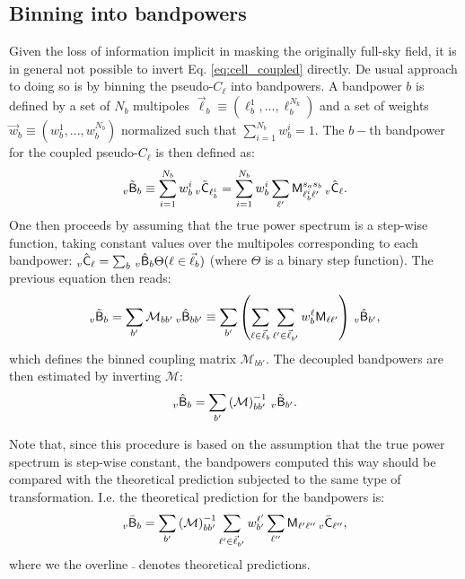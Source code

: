 \documentclass[a4paper,10pt]{article}
\begin{document}
\subsection{Binning into bandpowers}
  Given the loss of information implicit in masking the originally full-sky field, it is in general not possible to invert Eq. \ref{eq:cell_coupled} directly. De usual approach to doing so is by binning the pseudo-$C_\ell$ into bandpowers. A bandpower $b$ is defined by a set of $N_b$ multipoles $\vec{\ell}_b\equiv(\ell_b^1,...,\ell_b^{N_k})$ and a set of weights $\vec{w}_b\equiv(w_b^1,...,w_b^{N_b})$ normalized such that $\sum_{i=1}^{N_b}w_b^i=1$. The $b-$th bandpower for the coupled pseudo-$C_\ell$ is then defined as:
  \begin{equation}
    _v\tilde{\sf B}_b \equiv\sum_{i=1}^{N_b}w_b^i\,_v\tilde{\sf C}_{\ell_b^i}
    =\sum_{i=1}^{N_b}w_b^i\sum_{\ell'}{\sf M}^{s_as_b}_{\ell_b^i\ell'}\,_v\hat{\sf C}_\ell.
  \end{equation}
  One then proceeds by assuming that the true power spectrum is a step-wise function, taking constant values over the multipoles corresponding to each bandpower: $_v\hat{\sf C}_\ell=\sum_b\,_v\hat{\sf B}_b\Theta(\ell\in\vec{\ell}_b)$ (where $\Theta$ is a binary step function). The previous equation then reads:
  \begin{equation}
   _v\tilde{\sf B}_b=\sum_{b'}\mathcal{M}_{bb'}\,_v\hat{\sf B}_{bb'}\equiv\sum_{b'}\left(\sum_{\ell\in\vec{\ell}_b}\sum_{\ell'\in\vec{\ell}_{b'}}w_b^\ell{\sf M}_{\ell\ell'}\right)\,_v\hat{\sf B}_{b'},
  \end{equation}
  which defines the binned coupling matrix $\mathcal{M}_{bb'}$. The decoupled bandpowers are then estimated by inverting $\mathcal{M}$:
  \begin{equation}
    _v\hat{\sf B}_b=\sum_{b'}\left(\mathcal{M}\right)^{-1}_{bb'}\,_v\tilde{\sf B}_{b'}.
  \end{equation}

  Note that, since this procedure is based on the assumption that the true power spectrum is step-wise constant, the bandpowers computed this way should be compared with the theoretical prediction subjected to the same type of transformation. I.e. the theoretical prediction for the bandpowers is:
  \begin{equation}
    _v\bar{\sf B}_b=\sum_{b'}\left(\mathcal{M}\right)^{-1}_{bb'}\sum_{\ell'\in\vec{\ell}_{b'}}w_{b'}^{\ell'}\sum_{\ell''}{\sf M}_{\ell'\ell''}\,_v\bar{\sf C}_{\ell''},
  \end{equation}
  where we the overline $\bar{\,}$ denotes theoretical predictions.
\end{document}
